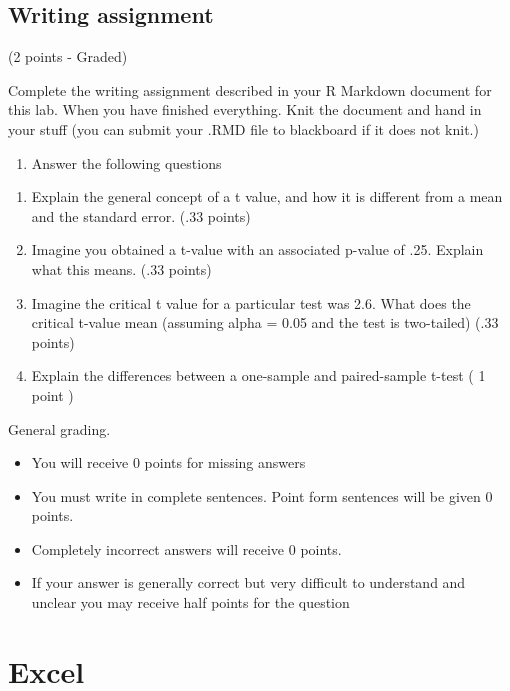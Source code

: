 \documentclass[
]{book}
\providecommand{\tightlist}{%
  \setlength{\itemsep}{0pt}\setlength{\parskip}{0pt}}
\begin{document}
\hypertarget{writing-assignment-5}{%
\subsection{Writing assignment}\label{writing-assignment-5}}

(2 points - Graded)

Complete the writing assignment described in your R Markdown document for this lab. When you have finished everything. Knit the document and hand in your stuff (you can submit your .RMD file to blackboard if it does not knit.)

\begin{enumerate}
\def\labelenumi{\arabic{enumi}.}
\tightlist
\item
  Answer the following questions
\end{enumerate}

\begin{enumerate}
\def\labelenumi{\alph{enumi}.}
\item
  Explain the general concept of a t value, and how it is different from a mean and the standard error. (.33 points)
\item
  Imagine you obtained a t-value with an associated p-value of .25. Explain what this means. (.33 points)
\item
  Imagine the critical t value for a particular test was 2.6. What does the critical t-value mean (assuming alpha = 0.05 and the test is two-tailed) (.33 points)
\item
  Explain the differences between a one-sample and paired-sample t-test ( 1 point )
\end{enumerate}

General grading.

\begin{itemize}
\tightlist
\item
  You will receive 0 points for missing answers
\item
  You must write in complete sentences. Point form sentences will be given 0 points.
\item
  Completely incorrect answers will receive 0 points.
\item
  If your answer is generally correct but very difficult to understand and unclear you may receive half points for the question
\end{itemize}

\hypertarget{excel-6}{%
\section{Excel}\label{excel-6}}
\end{document}
